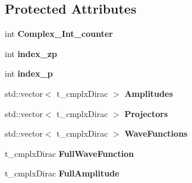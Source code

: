 \subsection*{Protected Attributes}
\begin{DoxyCompactItemize}
\item 
\hypertarget{class_c___b_s_e___hadron___base_a980105290894a646559780dad70c27ba}{int {\bfseries Complex\-\_\-\-Int\-\_\-counter}}\label{class_c___b_s_e___hadron___base_a980105290894a646559780dad70c27ba}

\item 
\hypertarget{class_c___b_s_e___hadron___base_a56baa6057fa91cd73f754494a4915581}{int {\bfseries index\-\_\-zp}}\label{class_c___b_s_e___hadron___base_a56baa6057fa91cd73f754494a4915581}

\item 
\hypertarget{class_c___b_s_e___hadron___base_a93d0da005e99e2db87a8e625e380417d}{int {\bfseries index\-\_\-p}}\label{class_c___b_s_e___hadron___base_a93d0da005e99e2db87a8e625e380417d}

\item 
\hypertarget{class_c___b_s_e___hadron___base_abfeef5ecb3c97e9f1da15f6d19ec270b}{std\-::vector$<$ t\-\_\-cmplx\-Dirac $>$ {\bfseries Amplitudes}}\label{class_c___b_s_e___hadron___base_abfeef5ecb3c97e9f1da15f6d19ec270b}

\item 
\hypertarget{class_c___b_s_e___hadron___base_a0e5825d1200c8414e186a7b745258ea1}{std\-::vector$<$ t\-\_\-cmplx\-Dirac $>$ {\bfseries Projectors}}\label{class_c___b_s_e___hadron___base_a0e5825d1200c8414e186a7b745258ea1}

\item 
\hypertarget{class_c___b_s_e___hadron___base_acfa5dfe5fc2b158b98855989162b1ebf}{std\-::vector$<$ t\-\_\-cmplx\-Dirac $>$ {\bfseries Wave\-Functions}}\label{class_c___b_s_e___hadron___base_acfa5dfe5fc2b158b98855989162b1ebf}

\item 
\hypertarget{class_c___b_s_e___hadron___base_a5446aa5cb7a419a1510936e8bdc87383}{t\-\_\-cmplx\-Dirac {\bfseries Full\-Wave\-Function}}\label{class_c___b_s_e___hadron___base_a5446aa5cb7a419a1510936e8bdc87383}

\item 
\hypertarget{class_c___b_s_e___hadron___base_ab7e88bade17133914684d5b8abafee9b}{t\-\_\-cmplx\-Dirac {\bfseries Full\-Amplitude}}\label{class_c___b_s_e___hadron___base_ab7e88bade17133914684d5b8abafee9b}


\end{DoxyCompactItemize}

